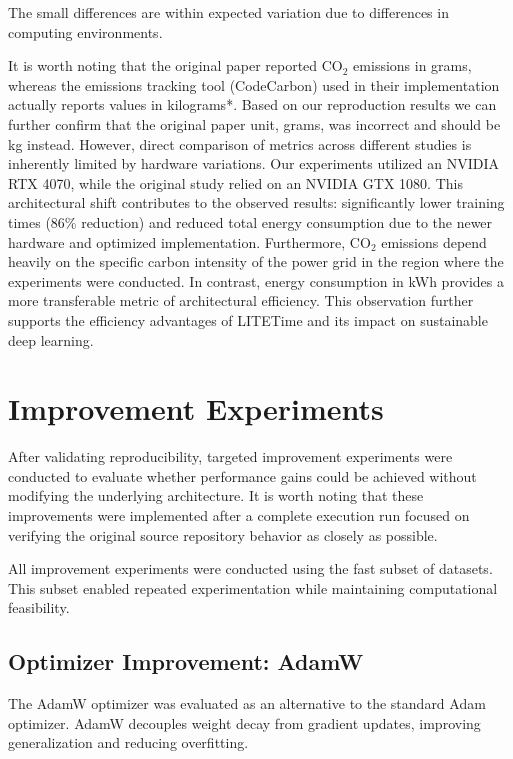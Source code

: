 \documentclass[conference]{IEEEtran}
\begin{document}
The small differences are within expected variation due to differences in computing environments.

It is worth noting that the original paper reported CO$_2$ emissions in grams, whereas the emissions tracking tool (CodeCarbon) used in their implementation actually reports values in kilograms*. Based on our reproduction results we can further confirm that the original paper unit, grams, was incorrect and should be kg instead. However, direct comparison of metrics across different studies is inherently limited by hardware variations. Our experiments utilized an NVIDIA RTX 4070, while the original study relied on an NVIDIA GTX 1080. This architectural shift contributes to the observed results: significantly lower training times (86\% reduction) and reduced total energy consumption due to the newer hardware and optimized implementation. Furthermore, CO$_2$ emissions depend heavily on the specific carbon intensity of the power grid in the region where the experiments were conducted. In contrast, energy consumption in kWh provides a more transferable metric of architectural efficiency. This observation further supports the efficiency advantages of LITETime and its impact on sustainable deep learning.


\section{Improvement Experiments}

After validating reproducibility, targeted improvement experiments were conducted to evaluate whether performance gains could be achieved without modifying the underlying architecture. It is worth noting that these improvements were implemented after a complete execution run focused on verifying the original source repository behavior as closely as possible.

All improvement experiments were conducted using the fast subset of datasets. This subset enabled repeated experimentation while maintaining computational feasibility.

\subsection{Optimizer Improvement: AdamW}

The AdamW optimizer was evaluated as an alternative to the standard Adam optimizer. AdamW decouples weight decay from gradient updates, improving generalization and reducing overfitting.
\end{document}
